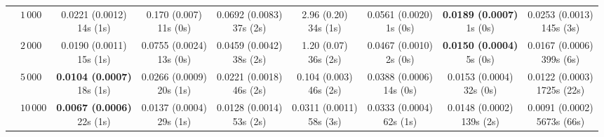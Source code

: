 \begin{table}[htbp]
{\begin{tabular}{llccccccc}
 & $1{\,}000$ & \makecell{0.0221 (0.0012) \\ \scriptsize 14s (1s)} & \makecell{0.170 (0.007) \\ \scriptsize 11s (0s)} & \makecell{0.0692 (0.0083) \\ \scriptsize 37s (2s)} & \makecell{2.96 (0.20) \\ \scriptsize 34s (1s)} & \makecell{0.0561 (0.0020) \\ \scriptsize 1s (0s)} & \makecell{\textbf{0.0189 (0.0007)} \\ \scriptsize 1s (0s)} & \makecell{0.0253 (0.0013) \\ \scriptsize 145s (3s)} \\
 & $2{\,}000$ & \makecell{0.0190 (0.0011) \\ \scriptsize 15s (1s)} & \makecell{0.0755 (0.0024) \\ \scriptsize 13s (0s)} & \makecell{0.0459 (0.0042) \\ \scriptsize 38s (2s)} & \makecell{1.20 (0.07) \\ \scriptsize 36s (2s)} & \makecell{0.0467 (0.0010) \\ \scriptsize 2s (0s)} & \makecell{\textbf{0.0150 (0.0004)} \\ \scriptsize 5s (0s)} & \makecell{0.0167 (0.0006) \\ \scriptsize 399s (6s)} \\
 & $5{\,}000$ & \makecell{\textbf{0.0104 (0.0007)} \\ \scriptsize 18s (1s)} & \makecell{0.0266 (0.0009) \\ \scriptsize 20s (1s)} & \makecell{0.0221 (0.0018) \\ \scriptsize 46s (2s)} & \makecell{0.104 (0.003) \\ \scriptsize 46s (2s)} & \makecell{0.0388 (0.0006) \\ \scriptsize 14s (0s)} & \makecell{0.0153 (0.0004) \\ \scriptsize 32s (0s)} & \makecell{0.0122 (0.0003) \\ \scriptsize 1725s (22s)} \\
 & $10{\,}000$ & \makecell{\textbf{0.0067 (0.0006)} \\ \scriptsize 22s (1s)} & \makecell{0.0137 (0.0004) \\ \scriptsize 29s (1s)} & \makecell{0.0128 (0.0014) \\ \scriptsize 53s (2s)} & \makecell{0.0311 (0.0011) \\ \scriptsize 58s (3s)} & \makecell{0.0333 (0.0004) \\ \scriptsize 62s (1s)} & \makecell{0.0148 (0.0002) \\ \scriptsize 139s (2s)} & \makecell{0.0091 (0.0002) \\ \scriptsize 5673s (66s)} \\

\end{tabular}}
\end{table}
